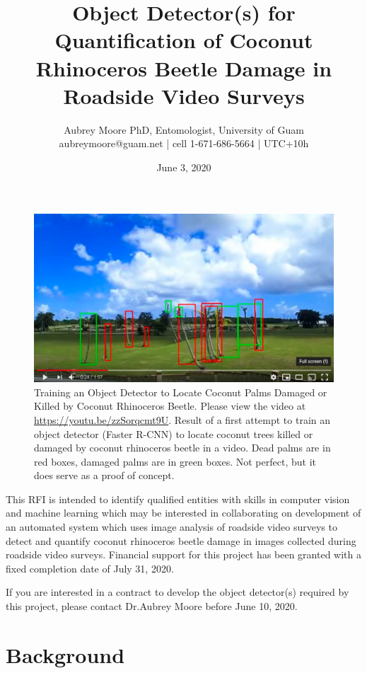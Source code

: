 \documentclass[12pt,letterpaper,english,bibliography=totocnumbered, abstract=on]{scrartcl}
\begin{document}
\titlehead{Request for Interest}

\title{Object Detector(s) for Quantification of Coconut Rhinoceros Beetle Damage in Roadside Video Surveys}

\author{Aubrey Moore PhD, Entomologist, University of Guam\\
	aubreymoore@guam.net | cell 1-671-686-5664 | UTC+10h}

\date{June 3, 2020}

\maketitle


\begin{figure}[h]
	\centering
	\includegraphics[width=0.7\linewidth]{images/royal-palms}
	\caption{Training an Object Detector to Locate Coconut Palms Damaged or Killed by Coconut Rhinoceros Beetle. Please view the video at \url{https://youtu.be/zzSorqcmt9U}. Result of a first attempt to train an object detector (Faster R-CNN) to locate coconut trees killed or damaged by coconut rhinoceros beetle in a video. Dead palms are in red boxes, damaged palms are in green boxes. Not perfect, but it does serve as a proof of concept.}
	\label{fig:royal-palms}
\end{figure}

This RFI is intended to identify qualified entities with skills in computer vision and machine learning which may be interested in collaborating on development of an automated system which uses image analysis of roadside video surveys to detect and quantify coconut rhinoceros beetle damage in images collected during roadside video surveys. Financial support for this project has been granted with a fixed completion date of July 31, 2020.

If you are interested in a contract to develop the object detector(s) required by this project, please contact Dr.Aubrey Moore before June 10, 2020.

\section{Background} 
\end{document}

